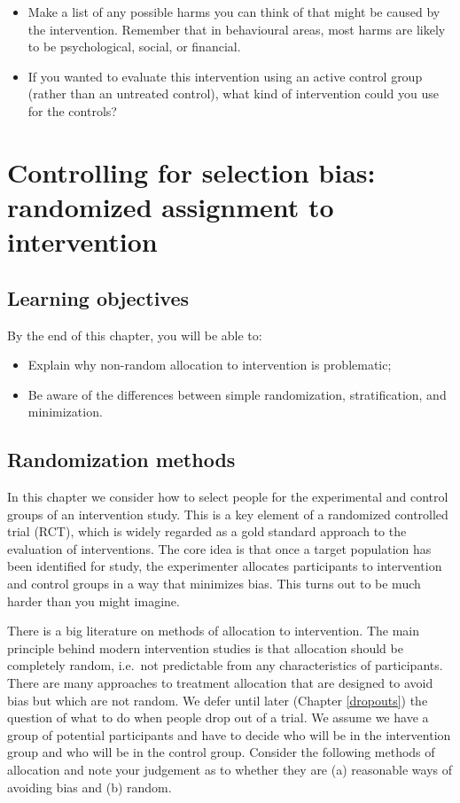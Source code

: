 \documentclass{krantz}
\providecommand{\tightlist}{%
\setlength{\itemsep}{0pt}\setlength{\parskip}{0pt}}
\begin{document}
\begin{itemize}
\tightlist
\item
  Make a list of any possible harms you can think of that might be caused by the intervention. Remember that in behavioural areas, most harms are likely to be psychological, social, or financial.
\item
  If you wanted to evaluate this intervention using an active control group (rather than an untreated control), what kind of intervention could you use for the controls?
\end{itemize}

\hypertarget{randomize}{%
\chapter{Controlling for selection bias: randomized assignment to intervention}\label{randomize}}

\hypertarget{learning-objectives-6}{%
\section{Learning objectives}\label{learning-objectives-6}}

By the end of this chapter, you will be able to:

\begin{itemize}
\item
  Explain why non-random allocation to intervention is problematic;
\item
  Be aware of the differences between simple randomization, stratification, and minimization.
\end{itemize}

\hypertarget{randomization-methods}{%
\section{Randomization methods}\label{randomization-methods}}

In this chapter we consider how to select people for the experimental and control groups of an intervention study. This is a key element of a randomized controlled trial (RCT), which is widely regarded as a gold standard approach to the evaluation of interventions. The core idea is that once a target population has been identified for study, the experimenter allocates participants to intervention and control groups in a way that minimizes bias. This turns out to be much harder than you might imagine.

There is a big literature on methods of allocation to intervention. The main principle behind modern intervention studies is that allocation should be completely random, i.e.~not predictable from any characteristics of participants. There are many approaches to treatment allocation that are designed to avoid bias but which are not random. We defer until later (Chapter \ref{dropouts}) the question of what to do when people drop out of a trial. We assume we have a group of potential participants and have to decide who will be in the intervention group and who will be in the control group. Consider the following methods of allocation and note your judgement as to whether they are (a) reasonable ways of avoiding bias and (b) random.
\end{document}

